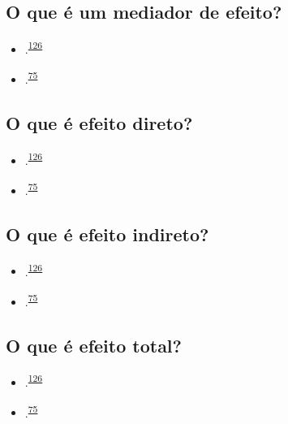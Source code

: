 \documentclass[
]{book}
\begin{document}
\hypertarget{o-que-uxe9-um-mediador-de-efeito}{%
\subsection{O que é um mediador de efeito?}\label{o-que-uxe9-um-mediador-de-efeito}}

\begin{itemize}
\item
  .\textsuperscript{\protect\hyperlink{ref-Baron1986}{126}}
\item
  .\textsuperscript{\protect\hyperlink{ref-Bours2023}{75}}
\end{itemize}

\hypertarget{o-que-uxe9-efeito-direto}{%
\subsection{O que é efeito direto?}\label{o-que-uxe9-efeito-direto}}

\begin{itemize}
\item
  .\textsuperscript{\protect\hyperlink{ref-Baron1986}{126}}
\item
  .\textsuperscript{\protect\hyperlink{ref-Bours2023}{75}}
\end{itemize}

\hypertarget{o-que-uxe9-efeito-indireto}{%
\subsection{O que é efeito indireto?}\label{o-que-uxe9-efeito-indireto}}

\begin{itemize}
\item
  .\textsuperscript{\protect\hyperlink{ref-Baron1986}{126}}
\item
  .\textsuperscript{\protect\hyperlink{ref-Bours2023}{75}}
\end{itemize}

\hypertarget{o-que-uxe9-efeito-total}{%
\subsection{O que é efeito total?}\label{o-que-uxe9-efeito-total}}

\begin{itemize}
\item
  .\textsuperscript{\protect\hyperlink{ref-Baron1986}{126}}
\item
  .\textsuperscript{\protect\hyperlink{ref-Bours2023}{75}}
\end{itemize}
\end{document}
